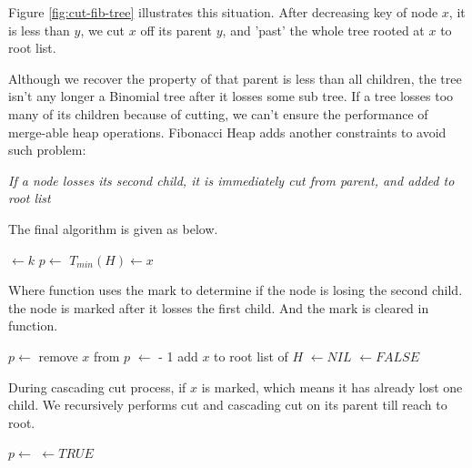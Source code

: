 \documentclass{article}
\begin{document}
Figure \ref{fig:cut-fib-tree} illustrates this situation. After decreasing
key of node $x$, it is less than $y$, we cut $x$ off its parent $y$, and
'past' the whole tree rooted at $x$ to root list.

Although we recover the property of that parent is less than all children,
the tree isn't any longer a Binomial tree after it losses some sub tree.
If a tree losses too many of its children because of cutting, we can't ensure
the performance of merge-able heap operations. Fibonacci Heap adds another
constraints to avoid such problem:

{\em If a node losses its second child, it is immediately cut from parent,
and added to root list}

The final  algorithm is given as below.

\begin{algorithmic}[1]
  \State {} $\gets k$
  \State $p \gets $ 
    \State {}
    \State {}
  \EndIf
    \State $T_{min}(H) \gets x$
  \EndIf
\EndFunction
\end{algorithmic}

Where function  uses the mark to determine 
if the node is losing the second child. the node is marked after
it losses the first child. And the mark is cleared in  
function.

\begin{algorithmic}[1]
  \State $p \gets $ 
  \State remove $x$ from $p$
  \State {} $\gets$  - 1
  \State add $x$ to root list of $H$
  \State {} $\gets NIL$
  \State {} $\gets FALSE$
\EndFunction
\end{algorithmic}

During cascading cut process, if $x$ is marked, which means it has
already lost one child. We recursively performs cut and cascading cut
on its parent till reach to root.

\begin{algorithmic}[1]
  \State $p \gets $ 
      \State {} $\gets TRUE$
    \Else
      \State {}
      \State {}
    \EndIf
  \EndIf
\EndFunction
\end{algorithmic}
\end{document}
